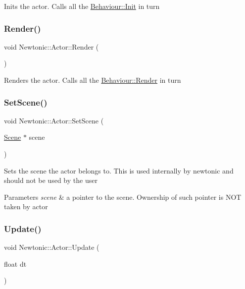 Inits the actor. Calls all the \mbox{\hyperlink{classNewtonic_1_1Behaviour_a54a1d17213841de1d7bde8aaadfc99e4}{Behaviour\+::\+Init}} in turn \mbox{\label{classNewtonic_1_1Actor_af60303c39a4fe3dd3930d8351e432bc3}} 
\subsubsection{\texorpdfstring{Render()}{Render()}}
{\footnotesize\ttfamily void Newtonic\+::\+Actor\+::\+Render (\begin{DoxyParamCaption}{ }\end{DoxyParamCaption})}

Renders the actor. Calls all the \mbox{\hyperlink{classNewtonic_1_1Behaviour_ab219950e152ca8b9cb6f54d024667627}{Behaviour\+::\+Render}} in turn \mbox{\label{classNewtonic_1_1Actor_a2520c978e52805a2d76cc8eb865abb88}} 
\subsubsection{\texorpdfstring{SetScene()}{SetScene()}}
{\footnotesize\ttfamily void Newtonic\+::\+Actor\+::\+Set\+Scene (\begin{DoxyParamCaption}\item[{\mbox{\hyperlink{classNewtonic_1_1Scene}{Scene}} $\ast$}]{scene }\end{DoxyParamCaption})\hspace{0.3cm}{\ttfamily [inline]}}

Sets the scene the actor belongs to. This is used internally by newtonic and should not be used by the user 
\begin{DoxyParams}{Parameters}
{\em scene} & a pointer to the scene. Ownership of such pointer is N\+OT taken by actor \\
\hline
\end{DoxyParams}
\mbox{\label{classNewtonic_1_1Actor_addf35c24938904d5ac3baa82eac478d3}} 
\subsubsection{\texorpdfstring{Update()}{Update()}}
{\footnotesize\ttfamily void Newtonic\+::\+Actor\+::\+Update (\begin{DoxyParamCaption}\item[{float}]{dt }\end{DoxyParamCaption})}

